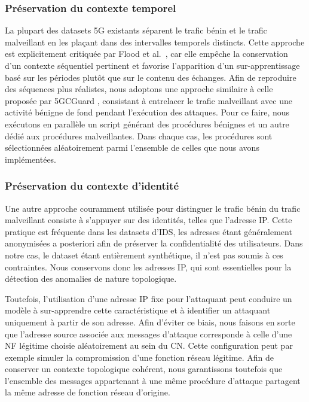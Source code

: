 \documentclass[a4paper,11pt,twoside]{StyleThese}
\begin{document}
\subsubsection{Préservation du contexte temporel}
La plupart des datasets 5G existants séparent le trafic bénin et le trafic malveillant en les plaçant dans des intervalles temporels distincts. Cette approche est explicitement critiquée par Flood et al.~\cite{badsmell}, car elle empêche la conservation d’un contexte séquentiel pertinent et favorise l'apparition d'un sur-apprentissage basé sur les périodes plutôt que sur le contenu des échanges. Afin de reproduire des séquences plus réalistes, nous adoptons une approche similaire à celle proposée par 5GCGuard \cite{5GCGuard}, consistant à entrelacer le trafic malveillant avec une activité bénigne de fond pendant l’exécution des attaques. Pour ce faire, nous exécutons en parallèle un script générant des procédures bénignes et un autre dédié aux procédures malveillantes. Dans chaque cas, les procédures sont sélectionnées aléatoirement parmi l’ensemble de celles que nous avons implémentées.

\subsubsection{Préservation du contexte d’identité}
Une autre approche couramment utilisée pour distinguer le trafic bénin du trafic malveillant consiste à s’appuyer sur des identités, telles que l’adresse IP. Cette pratique est fréquente dans les datasets d'IDS, les adresses étant généralement anonymisées a posteriori afin de préserver la confidentialité des utilisateurs. Dans notre cas, le dataset étant entièrement synthétique, il n’est pas soumis à ces contraintes. Nous conservons donc les adresses IP, qui sont essentielles pour la détection des anomalies de nature topologique. 

Toutefois, l’utilisation d’une adresse IP fixe pour l’attaquant peut conduire un modèle à sur-apprendre cette caractéristique et à identifier un attaquant uniquement à partir de son adresse. Afin d’éviter ce biais, nous faisons en sorte que l’adresse source associée aux messages d’attaque corresponde à celle d’une NF légitime choisie aléatoirement au sein du CN. Cette configuration peut par exemple simuler la compromission d’une fonction réseau légitime. Afin de conserver un contexte topologique cohérent, nous garantissons toutefois que l’ensemble des messages appartenant à une même procédure d’attaque partagent la même adresse de fonction réseau d’origine.
\end{document}
